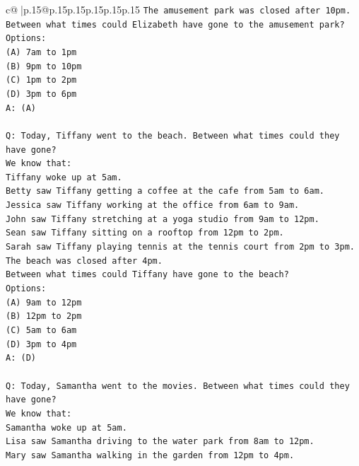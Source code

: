 \documentclass{article}
\begin{document}
{\begin{supertabular}{c@{$\;$}|p{.15\linewidth}@{}p{.15\linewidth}p{.15\linewidth}p{.15\linewidth}p{.15\linewidth}p{.15\linewidth}}
{{{\texttt{The amusement park was closed after 10pm.} \\
\texttt{Between what times could Elizabeth have gone to the amusement park?} \\
\texttt{Options:} \\
\texttt{(A) 7am to 1pm} \\
\texttt{(B) 9pm to 10pm} \\
\texttt{(C) 1pm to 2pm} \\
\texttt{(D) 3pm to 6pm} \\
\texttt{A: (A)} \\
\\ 
\texttt{Q: Today, Tiffany went to the beach. Between what times could they have gone?} \\
\texttt{We know that:} \\
\texttt{Tiffany woke up at 5am.} \\
\texttt{Betty saw Tiffany getting a coffee at the cafe from 5am to 6am.} \\
\texttt{Jessica saw Tiffany working at the office from 6am to 9am.} \\
\texttt{John saw Tiffany stretching at a yoga studio from 9am to 12pm.} \\
\texttt{Sean saw Tiffany sitting on a rooftop from 12pm to 2pm.} \\
\texttt{Sarah saw Tiffany playing tennis at the tennis court from 2pm to 3pm.} \\
\texttt{The beach was closed after 4pm.} \\
\texttt{Between what times could Tiffany have gone to the beach?} \\
\texttt{Options:} \\
\texttt{(A) 9am to 12pm} \\
\texttt{(B) 12pm to 2pm} \\
\texttt{(C) 5am to 6am} \\
\texttt{(D) 3pm to 4pm} \\
\texttt{A: (D)} \\
\\ 
\texttt{Q: Today, Samantha went to the movies. Between what times could they have gone?} \\
\texttt{We know that:} \\
\texttt{Samantha woke up at 5am.} \\
\texttt{Lisa saw Samantha driving to the water park from 8am to 12pm.} \\
\texttt{Mary saw Samantha walking in the garden from 12pm to 4pm.} \\
}}}
\end{supertabular}}
\end{document}
